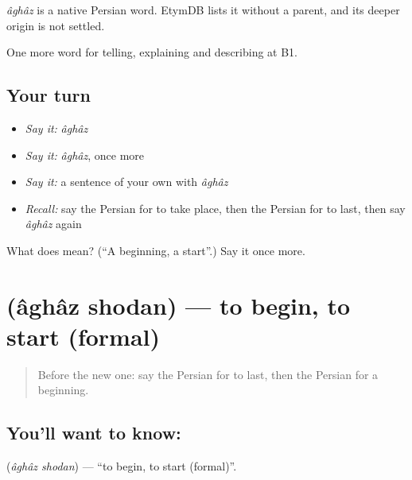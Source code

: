 \begin{cousinweb}
\emph{âghâz} is a native Persian word. EtymDB lists it without a parent, and its deeper origin is not settled.
\end{cousinweb}

\begin{grammarlens}[title={What you've built}]
One more word for telling, explaining and describing at B1.
\end{grammarlens}

\subsection*{Your turn}
\begin{itemize}
\raggedright
  \item \emph{Say it:} \emph{âghâz}
  \item \emph{Say it:} \emph{âghâz}, once more
  \item \emph{Say it:} a sentence of your own with \emph{âghâz}
  \item \emph{Recall:} say the Persian for to take place, then the Persian for to last, then say \emph{âghâz} again
\end{itemize}

\begin{tcolorbox}[breakable,colback=teal!4,colframe=teal!35!black,title={Before you move on}]
What does  mean? (\textquotedblleft{}A beginning, a start\textquotedblright{}.) Say it once more.
\end{tcolorbox}
\section[\texorpdfstring{\fa{آغاز} \fa{شدن} (âghâz shodan)}{آغاز شدن (âghâz shodan)}]{  (âghâz shodan) — to begin, to start (formal)}

\label{lesson:FA-C302-aghaz-shodan}



\begin{quote}
Before the new one: say the Persian for to last, then the Persian for a beginning.
\end{quote}

\subsection*{You'll want to know:  }
\textbf{ } (\emph{âghâz shodan}) — \textquotedblleft{}to begin, to start (formal)\textquotedblright{}.

